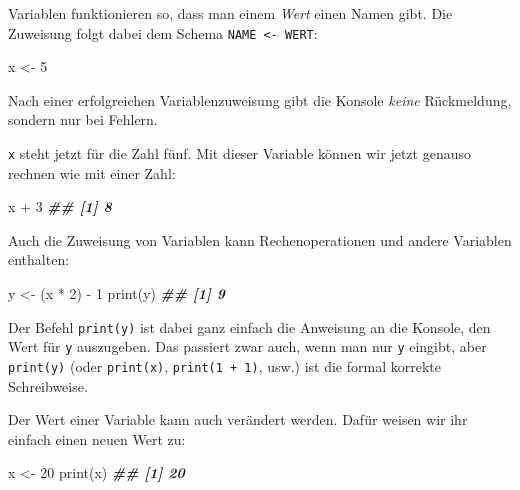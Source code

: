 \documentclass[11pt,german,a4paper]{article}
\newenvironment{Shaded}{\begin{snugshade}}{\end{snugshade}}
\newcommand{\DecValTok}[1]{\textcolor[rgb]{0.00,0.00,0.81}{#1}}
\newcommand{\DocumentationTok}[1]{\textcolor[rgb]{0.56,0.35,0.01}{\textbf{\textit{#1}}}}
\newcommand{\FunctionTok}[1]{\textcolor[rgb]{0.00,0.00,0.00}{#1}}
\newcommand{\NormalTok}[1]{#1}
\newcommand{\OtherTok}[1]{\textcolor[rgb]{0.56,0.35,0.01}{#1}}
\newcommand{\SpecialCharTok}[1]{\textcolor[rgb]{0.00,0.00,0.00}{#1}}
\begin{document}
Variablen funktionieren so, dass man einem \emph{Wert} einen Namen gibt. Die Zuweisung folgt dabei dem Schema \texttt{NAME\ \textless{}-\ WERT}:

\begin{Shaded}
\begin{Highlighting}[]
\NormalTok{x }\OtherTok{\textless{}{-}} \DecValTok{5}
\end{Highlighting}
\end{Shaded}

Nach einer erfolgreichen Variablenzuweisung gibt die Konsole \emph{keine} Rückmeldung, sondern nur bei Fehlern.

\texttt{x} steht jetzt für die Zahl fünf. Mit dieser Variable können wir jetzt genauso rechnen wie mit einer Zahl:

\begin{Shaded}
\begin{Highlighting}[]
\NormalTok{x }\SpecialCharTok{+} \DecValTok{3}
\DocumentationTok{\#\# [1] 8}
\end{Highlighting}
\end{Shaded}

Auch die Zuweisung von Variablen kann Rechenoperationen und andere Variablen enthalten:

\begin{Shaded}
\begin{Highlighting}[]
\NormalTok{y }\OtherTok{\textless{}{-}}\NormalTok{ (x }\SpecialCharTok{*} \DecValTok{2}\NormalTok{) }\SpecialCharTok{{-}} \DecValTok{1}
\FunctionTok{print}\NormalTok{(y)}
\DocumentationTok{\#\# [1] 9}
\end{Highlighting}
\end{Shaded}

Der Befehl \texttt{print(y)} ist dabei ganz einfach die Anweisung an die Konsole, den Wert für \texttt{y} auszugeben. Das passiert zwar auch, wenn man nur \texttt{y} eingibt, aber \texttt{print(y)} (oder \texttt{print(x)}, \texttt{print(1\ +\ 1)}, usw.) ist die formal korrekte Schreibweise.

Der Wert einer Variable kann auch verändert werden. Dafür weisen wir ihr einfach einen neuen Wert zu:

\begin{Shaded}
\begin{Highlighting}[]
\NormalTok{x }\OtherTok{\textless{}{-}} \DecValTok{20}
\FunctionTok{print}\NormalTok{(x)}
\DocumentationTok{\#\# [1] 20}
\end{Highlighting}
\end{Shaded}
\end{document}
